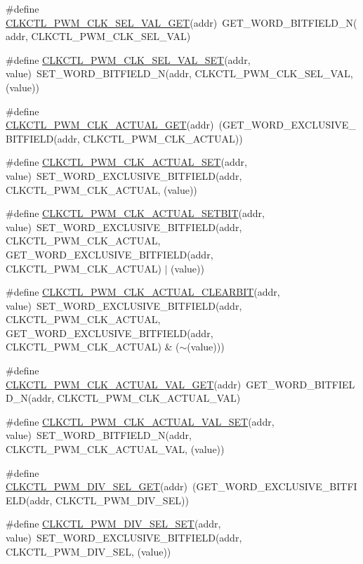 \begin{DoxyCompactItemize}
\item 
\#define \hyperlink{a00544_a850e3abfa2700e16547d1a5aeee54080}{CLKCTL\_\-PWM\_\-CLK\_\-SEL\_\-VAL\_\-GET}(addr)~GET\_\-WORD\_\-BITFIELD\_\-N(addr, CLKCTL\_\-PWM\_\-CLK\_\-SEL\_\-VAL)
\item 
\#define \hyperlink{a00544_aa7b1684a2ea202233113ec85f641e800}{CLKCTL\_\-PWM\_\-CLK\_\-SEL\_\-VAL\_\-SET}(addr, value)~SET\_\-WORD\_\-BITFIELD\_\-N(addr, CLKCTL\_\-PWM\_\-CLK\_\-SEL\_\-VAL, (value))
\item 
\#define \hyperlink{a00544_ab83cf81ea416397c6f0821c7aec2f134}{CLKCTL\_\-PWM\_\-CLK\_\-ACTUAL\_\-GET}(addr)~(GET\_\-WORD\_\-EXCLUSIVE\_\-BITFIELD(addr, CLKCTL\_\-PWM\_\-CLK\_\-ACTUAL))
\item 
\#define \hyperlink{a00544_a5177efc9088c7fa917425d9b88e623e4}{CLKCTL\_\-PWM\_\-CLK\_\-ACTUAL\_\-SET}(addr, value)~SET\_\-WORD\_\-EXCLUSIVE\_\-BITFIELD(addr, CLKCTL\_\-PWM\_\-CLK\_\-ACTUAL, (value))
\item 
\#define \hyperlink{a00544_ac734f7418cb596d6a25fd5d2438e019f}{CLKCTL\_\-PWM\_\-CLK\_\-ACTUAL\_\-SETBIT}(addr, value)~SET\_\-WORD\_\-EXCLUSIVE\_\-BITFIELD(addr, CLKCTL\_\-PWM\_\-CLK\_\-ACTUAL, GET\_\-WORD\_\-EXCLUSIVE\_\-BITFIELD(addr, CLKCTL\_\-PWM\_\-CLK\_\-ACTUAL) $|$ (value))
\item 
\#define \hyperlink{a00544_a41ad67dc1e2c5cb6c0e90e599e72949b}{CLKCTL\_\-PWM\_\-CLK\_\-ACTUAL\_\-CLEARBIT}(addr, value)~SET\_\-WORD\_\-EXCLUSIVE\_\-BITFIELD(addr, CLKCTL\_\-PWM\_\-CLK\_\-ACTUAL, GET\_\-WORD\_\-EXCLUSIVE\_\-BITFIELD(addr, CLKCTL\_\-PWM\_\-CLK\_\-ACTUAL) \& ($\sim$(value)))
\item 
\#define \hyperlink{a00544_a8fe46e4050717b416389b554731c1303}{CLKCTL\_\-PWM\_\-CLK\_\-ACTUAL\_\-VAL\_\-GET}(addr)~GET\_\-WORD\_\-BITFIELD\_\-N(addr, CLKCTL\_\-PWM\_\-CLK\_\-ACTUAL\_\-VAL)
\item 
\#define \hyperlink{a00544_ab2e6192d1fc60ca045d7480d29e9877e}{CLKCTL\_\-PWM\_\-CLK\_\-ACTUAL\_\-VAL\_\-SET}(addr, value)~SET\_\-WORD\_\-BITFIELD\_\-N(addr, CLKCTL\_\-PWM\_\-CLK\_\-ACTUAL\_\-VAL, (value))
\item 
\#define \hyperlink{a00544_aab175104bf2d1aadd43d1a56ba7d40e4}{CLKCTL\_\-PWM\_\-DIV\_\-SEL\_\-GET}(addr)~(GET\_\-WORD\_\-EXCLUSIVE\_\-BITFIELD(addr, CLKCTL\_\-PWM\_\-DIV\_\-SEL))
\item 
\#define \hyperlink{a00544_a1ec3a327d00c1f3ac60e8109aa26fbc5}{CLKCTL\_\-PWM\_\-DIV\_\-SEL\_\-SET}(addr, value)~SET\_\-WORD\_\-EXCLUSIVE\_\-BITFIELD(addr, CLKCTL\_\-PWM\_\-DIV\_\-SEL, (value))
\item 

\end{DoxyCompactItemize}
